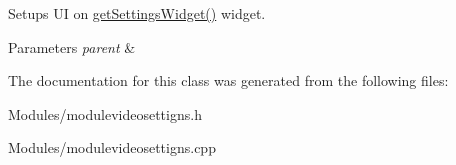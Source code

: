 Setups UI on \hyperlink{class_abstract_settings_widget_afc0c4a698fa75911990a3af2623b28b6}{getSettingsWidget()} widget. 


\begin{DoxyParams}{Parameters}
{\em parent} & \\
\hline
\end{DoxyParams}


The documentation for this class was generated from the following files:\begin{DoxyCompactItemize}
\item 
Modules/modulevideosettigns.h\item 
Modules/modulevideosettigns.cpp\end{DoxyCompactItemize}
